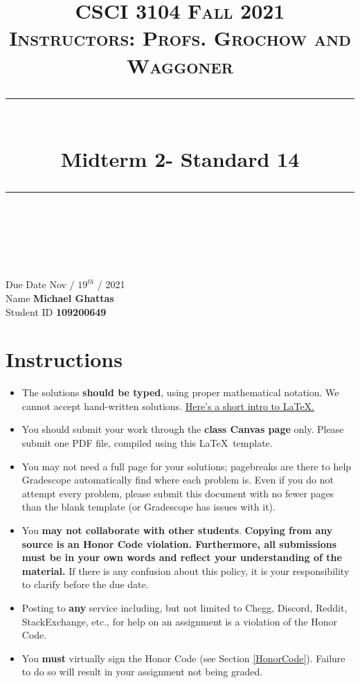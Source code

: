 \documentclass[11pt]{article}
\title{
\normalfont \normalsize 
\textsc{CSCI 3104 Fall 2021 \\ 
Instructors: Profs. Grochow and Waggoner} \\
[10pt] 
\rule{\linewidth}{0.5pt} \\[6pt] 
\huge Midterm 2- Standard 14 \\
\rule{\linewidth}{2pt}  \\[10pt]
}
\date{}
\theoremstyle{definition}
\theoremstyle{definition}
\theoremstyle{definition}
\begin{document}

\maketitle


\noindent
Due Date \dotfill Nov / $19^{th}$ / 2021 \\
Name \dotfill \textbf{Michael Ghattas} \\
Student ID \dotfill \textbf{109200649} \\


\tableofcontents

\section{Instructions}
 \begin{itemize}
	\item The solutions \textbf{should be typed}, using proper mathematical notation. We cannot accept hand-written solutions. \href{http://ece.uprm.edu/~caceros/latex/introduction.pdf}{Here's a short intro to \LaTeX.}
	\item You should submit your work through the \textbf{class Canvas page} only. Please submit one PDF file, compiled using this \LaTeX \ template.
	\item You may not need a full page for your solutions; pagebreaks are there to help Gradescope automatically find where each problem is. Even if you do not attempt every problem, please submit this document with no fewer pages than the blank template (or Gradescope has issues with it).

	\item You \textbf{may not collaborate with other students}. \textbf{Copying from any source is an Honor Code violation. Furthermore, all submissions must be in your own words and reflect your understanding of the material.} If there is any confusion about this policy, it is your responsibility to clarify before the due date. 

	\item Posting to \textbf{any} service including, but not limited to Chegg, Discord, Reddit, StackExchange, etc., for help on an assignment is a violation of the Honor Code.

	\item You \textbf{must} virtually sign the Honor Code (see Section \ref{HonorCode}). Failure to do so will result in your assignment not being graded.
\end{itemize}
\end{document}
